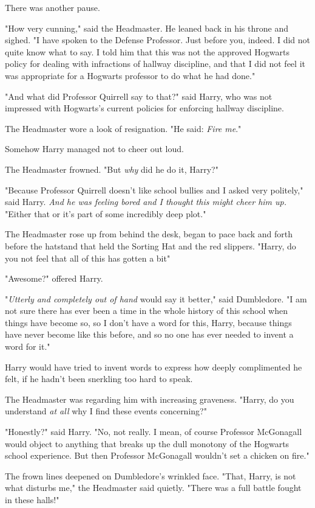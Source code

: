 There was another pause.

"How very cunning," said the Headmaster. He leaned back in his throne and
sighed. "I have spoken to the Defense Professor. Just before you, indeed. I did
not quite know what to say. I told him that this was not the approved Hogwarts
policy for dealing with infractions of hallway discipline, and that I did not
feel it was appropriate for a Hogwarts professor to do what he had done."

"And what did Professor Quirrell say to that?" said Harry, who was not
impressed with Hogwarts's current policies for enforcing hallway discipline.

The Headmaster wore a look of resignation. "He said: \emph{Fire me}."

Somehow Harry managed not to cheer out loud.

The Headmaster frowned. "But \emph{why} did he do it, Harry?"

"Because Professor Quirrell doesn't like school bullies and I asked very
politely," said Harry. \emph{And he was feeling bored and I thought this might
cheer him up.} "Either that or it's part of some incredibly deep plot."

The Headmaster rose up from behind the desk, began to pace back and forth
before the hatstand that held the Sorting Hat and the red slippers. "Harry, do
you not feel that all of this has gotten a bit{\el}"

"Awesome?" offered Harry.

"\emph{Utterly and completely out of hand} would say it better," said
Dumbledore. "I am not sure there has ever been a time in the whole history of
this school when things have become so, so{\el} I don't have a word for
this, Harry, because things have never become like this before, and so no one
has ever needed to invent a word for it."

Harry would have tried to invent words to express how deeply complimented he
felt, if he hadn't been snerkling too hard to speak.

The Headmaster was regarding him with increasing graveness. "Harry, do you
understand \emph{at all} why I find these events concerning?"

"Honestly?" said Harry. "No, not really. I mean, of course Professor McGonagall
would object to anything that breaks up the dull monotony of the Hogwarts
school experience. But then Professor McGonagall wouldn't set a chicken on
fire."

The frown lines deepened on Dumbledore's wrinkled face. "That, Harry, is not
what disturbs me," the Headmaster said quietly. "There was a full battle fought
in these halls!"


